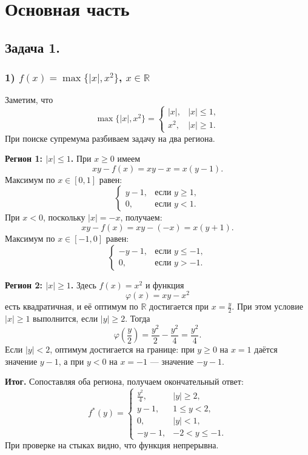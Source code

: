 \documentclass[a4paper,12pt]{article}
\title{}
\author{}
\date{}
\begin{document}
	
	\maketitle
	
	\section*{Основная часть}
	
	\subsection*{Задача 1.}
	
	\subsubsection*{1) $f(x)=\max\{|x|,x^2\}$, $x\in\mathbb{R}$}
	
	Заметим, что
	\[
	\max\{|x|,x^2\}=\begin{cases}
		|x|, & |x|\le1,\\[1mm]
		x^2, & |x|\ge1.
	\end{cases}
	\]
	При поиске супремума разбиваем задачу на два региона.
	
	\textbf{Регион 1: $|x|\le1$.}  
	При $x\ge0$ имеем
	\[
	xy - f(x) = xy - x = x(y-1).
	\]
	Максимум по $x\in[0,1]$ равен:
	\[
	\begin{cases}
		y-1, & \text{если } y\ge1,\\[1mm]
		0, & \text{если } y<1.
	\end{cases}
	\]
	При $x<0$, поскольку $|x|=-x$, получаем:
	\[
	xy - f(x) = xy - (-x)= x(y+1).
	\]
	Максимум по $x\in[-1,0]$ равен:
	\[
	\begin{cases}
		-y-1, & \text{если } y\le -1,\\[1mm]
		0, & \text{если } y>-1.
	\end{cases}
	\]
	
	\textbf{Регион 2: $|x|\ge1$.}  
	Здесь $f(x)=x^2$ и функция
	\[
	\varphi(x)=xy-x^2
	\]
	есть квадратичная, и её оптимум по $\mathbb{R}$ достигается при $x=\frac{y}{2}$. При этом условие $|x|\ge1$ выполнится, если $|y|\ge2$. Тогда
	\[
	\varphi\left(\frac{y}{2}\right)=\frac{y^2}{2}-\frac{y^2}{4}=\frac{y^2}{4}.
	\]
	Если $|y|<2$, оптимум достигается на границе: при $y\ge0$ на $x=1$ даётся значение $y-1$, а при $y<0$ на $x=-1$ --- значение $-y-1$.
	
	\textbf{Итог.} Сопоставляя оба региона, получаем окончательный ответ:
	\[
	f^*(y)=
	\begin{cases}
		\frac{y^2}{4}, & |y|\ge2,\\[1mm]
		y-1, & 1\le y<2,\\[1mm]
		0, & |y|<1,\\[1mm]
		-y-1, & -2<y\le -1.
	\end{cases}
	\]
	При проверке на стыках видно, что функция непрерывна.
	
\end{document}
